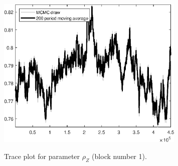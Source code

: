 \begin{figure}[H]
\centering
  \includegraphics[width=0.8\textwidth]{BRS_sectoral_wo_demand_shocks/graphs/TracePlot_rho_Z_blck_1}\\
    \caption{Trace plot for parameter ${\rho_Z}$ (block number 1).}
\end{figure}
